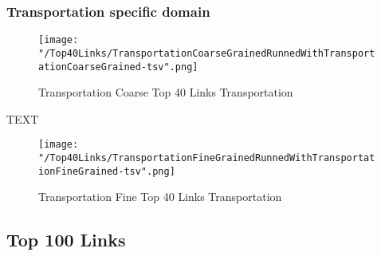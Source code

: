 \documentclass[thesis=M,english]{FITthesis}[2018/05/30]
\begin{document}
	\subsubsection{Transportation specific domain}
	\begin{figure}[H]\centering
		\texttt{[image: "/Top40Links/TransportationCoarseGrainedRunnedWithTransportationCoarseGrained-tsv".png]}
		\caption{Transportation Coarse Top 40 Links Transportation}\label{}
	\end{figure}		
	
		TEXT	

	\begin{figure}[H]\centering
		\texttt{[image: "/Top40Links/TransportationFineGrainedRunnedWithTransportationFineGrained-tsv".png]}
		\caption{Transportation Fine Top 40 Links Transportation}\label{}	
	\end{figure}

\subsection{Top 100 Links}
\end{document}
